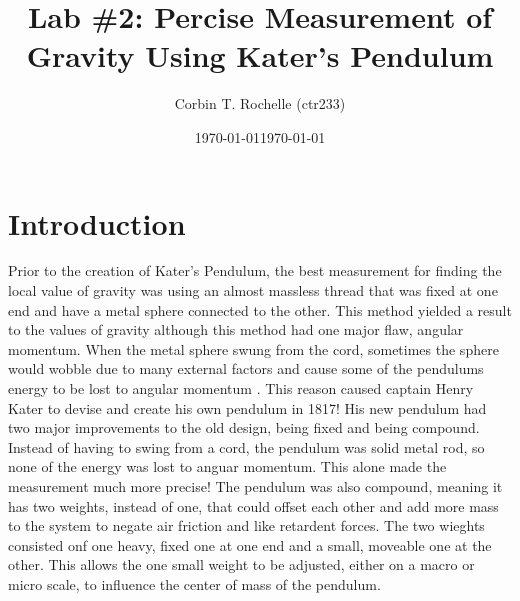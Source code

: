\documentclass[aps,prl,10pt,twocolumn,floatfix]{revtex4-2}
\begin{document}
\begin{abstract}
\end{abstract}


\title{Lab \#2: Percise Measurement of Gravity Using Kater's Pendulum}
\author{Corbin T. Rochelle (ctr233)}
\date{\today}
\date{\today}

\maketitle

\section{Introduction}\label{Intro}
Prior to the creation of Kater's Pendulum, the best measurement for finding the local value of gravity was using an almost massless thread that was fixed at one end and have a metal sphere connected to the other. 
This method yielded a result to the values of gravity although this method had one major flaw, angular momentum.
When the metal sphere swung from the cord, sometimes the sphere would wobble due to many external factors and cause some of the pendulums energy to be lost to angular momentum \cite{BeforeKater}. 
This reason caused captain Henry Kater to devise and create his own pendulum in 1817\cite{KatersWork}!
His new pendulum had two major improvements to the old design, being fixed and being compound. 
Instead of having to swing from a cord, the pendulum was solid metal rod, so none of the energy was lost to anguar momentum. 
This alone made the measurement much more precise!
The pendulum was also compound, meaning it has two weights, instead of one, that could offset each other and add more mass to the system to negate air friction and like retardent forces. 
The two wieghts consisted onf one heavy, fixed one at one end and a small, moveable one at the other. 
This allows the one small weight to be adjusted, either on a macro or micro scale, to influence the center of mass of the pendulum.  
\end{document}
